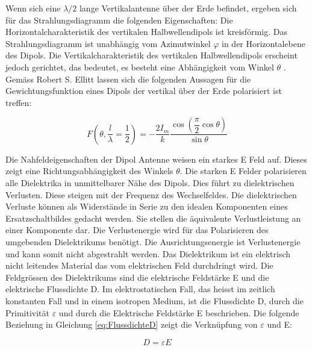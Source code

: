 Wenn sich eine $\lambda /2$ lange Vertikalantenne über der Erde befindet,  ergeben sich für das Strahlungsdiagramm die folgenden Eigenschaften: 
Die Horizontalcharakteristik des vertikalen Halbwellendipols ist kreisförmig. Das Strahlungsdiagramm ist unabhängig vom Azimutwinkel $\varphi$ in der Horizontalebene des Dipols. Die Vertikalcharakteristik des vertikalen Halbwellendipols erscheint jedoch gerichtet, das bedeutet, es besteht eine Abhängigkeit vom Winkel $\theta$ \cite{zinke1965lehrbuch}. 
Gemäss Robert S. Ellitt \cite{elliott1981antenna} lassen sich die folgenden Aussagen für die Gewichtungsfunktion  eines Dipols der vertikal über der Erde polarisiert ist treffen\cite{elliott1981antenna}:

\begin{equation}\label{eq:FDipolTheat}
F(\theta,\frac{l}{\lambda}=\dfrac{1}{2})=-\dfrac{2I_{m}}{k}\dfrac{\cos\left(\dfrac{\pi}{2}\cos\theta\right)}{\sin\theta}
\end{equation}


Die Nahfeldeigenschaften der Dipol Antenne weisen ein starkes E Feld auf. Dieses zeigt eine Richtungsabhängigkeit  des Winkels $\theta$. Die starken E Felder polarisieren alle Dielektrika in unmittelbarer Nähe des Dipols. Dies führt zu dielektrischen Verlusten. Diese steigen mit der Frequenz des Wechselfeldes. Die dielektrischen Verluste können als Widerstände in Serie zu den idealen Komponenten eines Ersatzschaltbildes gedacht werden. Sie stellen die äquivalente Verlustleistung an einer Komponente dar. Die Verlustenergie wird für das Polarisieren des umgebenden Dielektrikums 
benötigt. Die Ausrichtungsenergie ist Verlustenergie und kann somit nicht abgestrahlt werden.
Das Dielektrikum ist ein elektrisch nicht leitendes Material das vom elektrischen Feld durchdringt wird. Die Feldgrössen des Dielektrikums sind die elektrische Feldstärke E und die elektrische Flussdichte D. Im elektrostatischen Fall, das heisst im zeitlich konstanten Fall und in einem isotropen Medium, ist die Flussdichte D, durch die Primitivität $\varepsilon $ und durch die Elektrische Feldstärke E beschrieben. Die folgende Beziehung in Gleichung \ref{eq:FlussdichteD} zeigt die Verknüpfung von $\varepsilon $  und E:

\begin{equation}\label{eq:FlussdichteD}
D=\varepsilon E
\end{equation}

